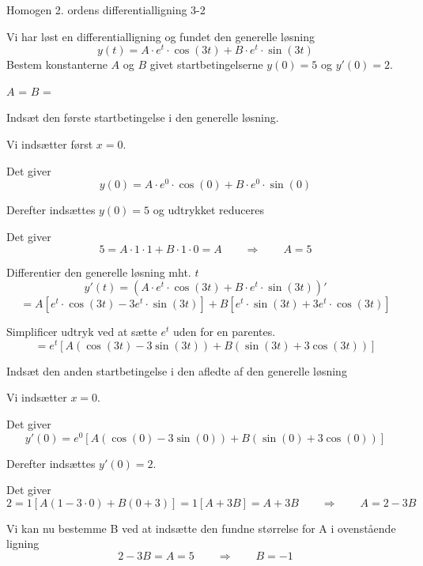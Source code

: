\documentclass{article}
\begin{document}
\newpage

\begin{exercise}{Homogen 2. ordens differentialligning 3-2}
	
	Vi har løst en differentialligning og fundet den generelle løsning
	\[
	y(t) = A \cdot e^{t}  \cdot \cos(3 t)+ B \cdot e^{t}  \cdot \sin(3 t)
	\]
	Bestem konstanterne $A$ og $B$ givet startbetingelserne $y(0)=5$ og $y'(0)=2$.
	
	
	$A$ = 		
$B$ = 
	
	\hint
	
	Indsæt den første startbetingelse i den generelle løsning. 
	
	
	\hint
	
	Vi indsætter først $x=0$.
	
	\hint
	
	Det giver
	\[
	y(0)=  A \cdot e^{0}  \cdot \cos(0)+ B \cdot e^{0}  \cdot \sin(0)
	\]
	
	\hint
	
	Derefter indsættes $y(0)=5$ og udtrykket reduceres
	
	\hint 
	
	Det giver 
	\[
	5= A \cdot 1  \cdot 1+ B \cdot 1  \cdot 0  = A \qquad \Rightarrow \qquad A = 5
	\]
	
	\hint 
	
	Differentier den generelle løsning mht. $t$
	\[
	y'(t) = \left(A \cdot e^{ t}  \cdot \cos(3 t)+ B \cdot e^{t}  \cdot \sin(3t)\right)' 
	\]
	\[
		= A \left[e^{t} \cdot \cos(3t) - 3e^{t} \cdot \sin(3t) \right] + B \left[e^{t} \cdot \sin(3t) + 3e^{t} \cdot \cos(3t) \right] 
	\]
	
	\hint
	
	Simplificer udtryk ved at sætte $e^{t}$ uden for en parentes.
	\[
	= e^{t} \left[ A (\cos(3t)-3\sin(3t)) + B (\sin(3t) + 3\cos(3t))   \right]
	\]
	
	\hint 
	
	Indsæt den anden startbetingelse i den afledte af den generelle løsning
	
	\hint
	
	Vi indsætter $x=0$.
	
	\hint 
	
	Det giver
	\[
	y'(0) = e^{0} \left[ A (\cos(0)-3 \sin(0)) + B (\sin(0) + 3 \cos(0))   \right]
	\]
	
	\hint 
	
	Derefter indsættes $y'(0)=2$.	
	\hint
	
	Det giver
	\[
	2 = 1 \left[ A (1- 3 \cdot 0) + B (0 + 3 )   \right] = 1 \left[ A +  3B    \right] = A + 3B \qquad \Rightarrow \qquad A = 2 - 3B
	\]
	
	\hint 
	
	Vi kan nu bestemme B ved at indsætte den fundne størrelse for A i ovenstående ligning
	\[
	2 - 3B = A = 5 \qquad \Rightarrow \qquad B = -1
	\]
	
	
\end{exercise}
\end{document}
